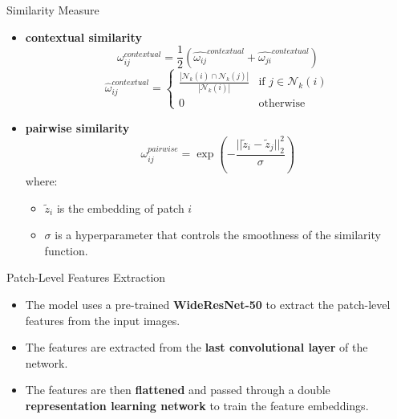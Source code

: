 \documentclass{beamer}
\begin{document}
\begin{frame}{Similarity Measure}
      \begin{itemize}
              \item \textbf{contextual similarity} \begin{equation}
                  \omega_{ij}^{contextual} = \frac{1}{2}(\hat{\omega_{ij}}^{contextual} + \hat{\omega_{ji}}^{contextual})
              \end{equation}
              \begin{equation}
                  \hat{\omega}_{ij}^{contextual} = \begin{cases}
                      \frac{|\mathcal{N}_k(i) \cap \mathcal{N}_k(j)|}{|\mathcal{N}_k(i)|} & \text{if } j \in \mathcal{N}_k(i)\\
                      0 & \text{otherwise}
                  \end{cases}
                  \end{equation}
              \item \textbf{pairwise similarity} \begin{equation}
                  \omega_{ij}^{pairwise} = \exp(-\frac{||\tilde{z}_i - \tilde{z}_j||^2_2}{\sigma})
                  \end{equation}
                  where:
                  \begin{itemize}
                      \item $\tilde{z}_i$ is the embedding of patch $i$ 
                      \item $\sigma$ is a hyperparameter that controls the smoothness of the similarity function.
              \end{itemize}
              \end{itemize}
  \end{frame}
  \begin{frame}{Patch-Level Features Extraction}
        \begin{itemize}
                \item The model uses a pre-trained \textbf{WideResNet-50}\cite{wideresnet} to extract
                 the patch-level features from the input images.
                \item The features are extracted from the \textbf{last convolutional layer} of the network.
                \item The features are then \textbf{flattened} and passed through a double \textbf{representation learning network}
                 to train the feature embeddings.
                \end{itemize}
  \end{frame}
\end{document}
